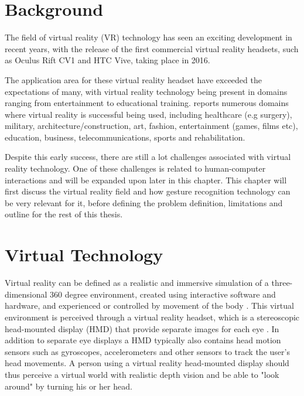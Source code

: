 \section{Background}            
The field of virtual reality (VR) technology has seen an exciting development in recent years, 
with the release of the first commercial virtual reality headsets, such as Oculus Rift CV1 and HTC Vive, taking place in 2016.

The application area for these virtual reality headset have exceeded the expectations of many, with virtual reality 
technology being present in domains ranging from entertainment to educational training\citep{VRS2016}. 
\citet{VRS2016} reports numerous domains where virtual reality is successful being used, including 
healthcare (e.g surgery), military, architecture/construction, art, fashion, entertainment (games, films etc), education, business, telecommunications, sports and rehabilitation.

Despite this early success, there are still a lot challenges associated with virtual reality technology. One of these challenges is related to human-computer interactions
and will be expanded upon later in this chapter. This chapter will first discuss the virtual reality field and how gesture recognition technology can be very relevant for it,
before defining the problem definition, limitations and outline for the rest of this thesis.



\section{Virtual Technology}
Virtual reality can be defined as a realistic and immersive simulation of a three-dimensional 360 degree environment, 
created using interactive software and hardware, and experienced or controlled by movement of the body \citep{VRS2016}.
This virtual environment is perceived through a virtual reality headset, which is a stereoscopic head-mounted display (HMD) that provide separate images for each eye \citep{POLYGON2016}. 
In addition to separate eye displays a HMD typically also contains head motion sensors such as gyroscopes, accelerometers 
and other sensors to track the user's head movements\citep{TW2016}. 
A person using a virtual reality head-mounted display should thus perceive a virtual world with realistic depth vision and be able to "look around" by turning his or her head.

